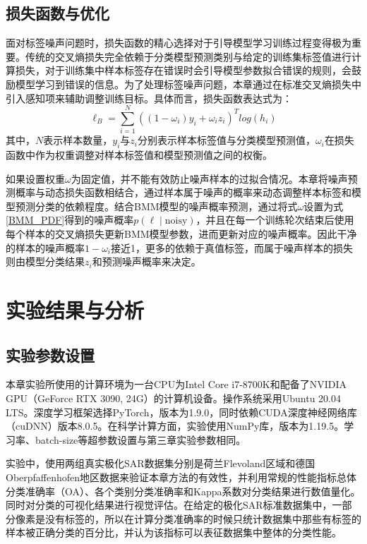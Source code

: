 \subsection{损失函数与优化}
面对标签噪声问题时，损失函数的精心选择对于引导模型学习训练过程变得极为重要。传统的交叉熵损失完全依赖于分类模型预测类别与给定的训练集标签值进行计算损失，对于训练集中样本标签存在错误时会引导模型参数拟合错误的规则，会鼓励模型学习到错误的信息。为了处理标签噪声问题，本章通过在标准交叉熵损失中引入感知项来辅助调整训练目标。具体而言，损失函数表达式为：
\begin{equation}
    \ell_B=\sum_{i=1}^{N}((1-\omega_i)y_i+\omega_iz_i)^Tlog(h_i)
\end{equation}
其中，$N$表示样本数量，$y_i$与$z_i$分别表示样本标签值与分类模型预测值，$\omega_i$在损失函数中作为权重调整对样本标签值和模型预测值之间的权衡。

如果设置权重$\omega$为固定值，并不能有效防止噪声样本的过拟合情况。本章将噪声预测概率与动态损失函数相结合，通过样本属于噪声的概率来动态调整样本标签和模型预测分类的依赖程度。结合BMM模型的噪声概率预测，通过将式$\omega$设置为式\ref{BMM_PDF}得到的噪声概率$p(\ell \mid \text{noisy})$，并且在每一个训练轮次结束后使用每个样本的交叉熵损失更新BMM模型参数，进而更新对应的噪声概率。因此干净的样本的噪声概率$1-\omega_i$接近1，更多的依赖于真值标签，而属于噪声样本的损失则由模型分类结果$z_i$和预测噪声概率来决定。

\section{实验结果与分析}
\subsection{实验参数设置}
本章实验所使用的计算环境为一台CPU为Intel Core i7-8700K和配备了NVIDIA GPU（GeForce RTX 3090, 24G）的计算机设备。操作系统采用Ubuntu 20.04 LTS。深度学习框架选择PyTorch，版本为1.9.0，同时依赖CUDA深度神经网络库（cuDNN）版本8.0.5。在科学计算方面，实验使用NumPy库，版本为1.19.5。学习率、batch-size等超参数设置与第三章实验参数相同。

实验中，使用两组真实极化SAR数据集分别是荷兰Flevoland区域和德国Oberpfaffenhofen地区数据来验证本章方法的有效性，并利用常规的性能指标总体分类准确率（OA）、各个类别分类准确率和Kappa系数对分类结果进行数值量化。同时对分类的可视化结果进行视觉评估。在给定的极化SAR标准数据集中，一部分像素是没有标签的，所以在计算分类准确率的时候只统计数据集中那些有标签的样本被正确分类的百分比，并认为该指标可以表征数据集中整体的分类性能。

